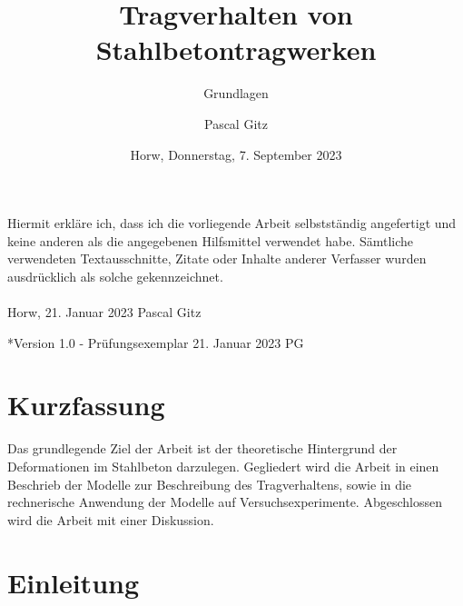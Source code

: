 \documentclass[
  12pt,
  letterpaper,
  egregdoesnotlikesansseriftitles]{scrreprt}
\title{Tragverhalten von Stahlbetontragwerken}
\subtitle
{Grundlagen}
\date{\large Horw, Donnerstag, 7. September 2023}
\author{Pascal Gitz}
\renewcommand*\contentsname{Inhaltsverzeichnis}
\newcommand\contentsname{Inhaltsverzeichnis}
\begin{document}
\maketitle

Hiermit erkläre ich, dass ich die vorliegende Arbeit selbstständig angefertigt und keine anderen als die angegebenen Hilfsmittel verwendet habe. Sämtliche verwendeten Textausschnitte, Zitate oder Inhalte anderer Verfasser wurden ausdrücklich als solche gekennzeichnet.\\%
%
\\%
%
Horw, 21. Januar 2023 \hfill Pascal Gitz%

\vfill

*Version 1.0 - Prüfungsexemplar \hfill 21. Januar 2023 \quad \quad \quad \quad \quad PG\\

\newpage

\chapter*{Kurzfassung}

Das grundlegende Ziel der Arbeit ist der theoretische Hintergrund der Deformationen im Stahlbeton darzulegen. Gegliedert wird die Arbeit in einen Beschrieb der Modelle zur Beschreibung des Tragverhaltens, sowie in die rechnerische Anwendung der Modelle auf Versuchsexperimente. Abgeschlossen wird die Arbeit mit einer Diskussion.

\ifdefined\Shaded\renewenvironment{Shaded}{\begin{tcolorbox}[frame hidden, interior hidden, sharp corners, breakable, borderline west={3pt}{0pt}{shadecolor}, boxrule=0pt, enhanced]}{\end{tcolorbox}}\fi

\renewcommand*\contentsname{Inhaltsverzeichnis}
{
\hypersetup{linkcolor=}
\setcounter{tocdepth}{1}
\tableofcontents
}

\hypertarget{einleitung}{%
\chapter{Einleitung}\label{einleitung}}
\end{document}
